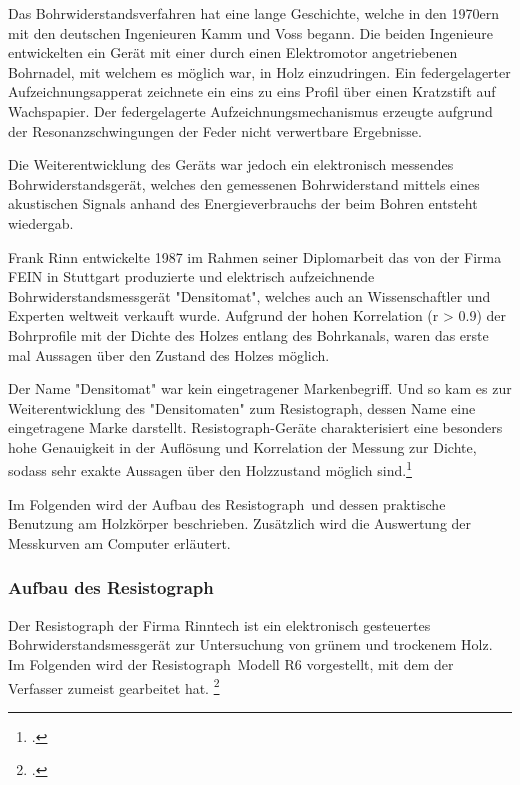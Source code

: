 \documentclass[a4paper, halfparskip]{article}
\def\SymbReg{\textsuperscript{\textregistered}}
\begin{document}
Das Bohrwiderstandsverfahren hat eine lange Geschichte, welche in den 1970ern
mit den deutschen Ingenieuren Kamm und Voss begann. Die beiden Ingenieure
entwickelten ein Gerät mit einer durch einen Elektromotor angetriebenen
Bohrnadel, mit welchem es möglich war, in Holz einzudringen. Ein
federgelagerter Aufzeichnungsapperat zeichnete ein eins zu eins Profil über
einen Kratzstift auf Wachspapier. Der federgelagerte Aufzeichnungsmechanismus
erzeugte aufgrund der Resonanzschwingungen der Feder nicht verwertbare
Ergebnisse. 

Die Weiterentwicklung des Geräts war jedoch ein elektronisch messendes
Bohrwiderstandsgerät, welches den gemessenen Bohrwiderstand mittels eines
akustischen Signals anhand des Energieverbrauchs der beim Bohren entsteht
wiedergab.

Frank Rinn entwickelte 1987 im Rahmen seiner Diplomarbeit das von der Firma
FEIN in Stuttgart produzierte und elektrisch aufzeichnende
Bohrwiderstandsmessgerät "Densitomat", welches auch an Wissenschaftler und
Experten weltweit verkauft wurde. Aufgrund der hohen Korrelation (r
\textgreater{} 0.9) der Bohrprofile mit der Dichte des Holzes entlang des
Bohrkanals, waren das erste mal Aussagen über den Zustand des Holzes möglich.

Der Name "Densitomat" war kein eingetragener Markenbegriff. Und so kam es zur
Weiterentwicklung des "Densitomaten" zum Resistograph\SymbReg, dessen Name
eine eingetragene Marke darstellt. Resistograph\SymbReg-Geräte charakterisiert
eine besonders hohe Genauigkeit in der Auflösung und Korrelation der Messung
zur Dichte, sodass sehr exakte Aussagen über den Holzzustand möglich
sind.\footcite{rinn:resi_drill_transition}

Im Folgenden wird der Aufbau des Resistograph\SymbReg\ und dessen praktische
Benutzung am Holzkörper beschrieben. Zusätzlich wird die Auswertung der
Messkurven am Computer erläutert. 

\subsubsection{Aufbau des Resistograph\SymbReg}
Der Resistograph der Firma Rinntech ist ein elektronisch gesteuertes
Bohrwiderstandsmessgerät zur Untersuchung von grünem und trockenem Holz. Im
Folgenden wird der Resistograph\SymbReg\ Modell R6 vorgestellt, mit dem der
Verfasser zumeist gearbeitet hat.
\footcite{rinn:risserkennung}
\end{document}
